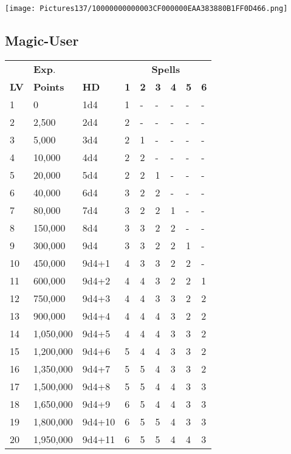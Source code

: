 \documentclass[a4paper,twoside,openany,10pt]{book}
\begin{document}
\begin{multicols}{2}
\addvspace{0.8cm}

\texttt{[image: Pictures137/10000000000003CF000000EAA383880B1FF0D466.png]}


\subsection{Magic-User}\label{magic-user}

\begin{tabular*}{0.93\linewidth}{@{\extracolsep{\fill}}lllllllll}
& \textbf{Exp}. & & \multicolumn{6}{c}{\textbf{Spells}} \\
\textbf{LV} & \textbf{Points} & \textbf{HD} & \textbf{1} & \textbf{2} & \textbf{3} & \textbf{4} & \textbf{5} & \textbf{6} \\\toprule
1 & 0 & 1d4 & 1 & - & - & - & - & - \\\hline
2 & 2,500 & 2d4 & 2 & - & - & - & - & - \\\hline
3 & 5,000 & 3d4 & 2 & 1 & - & - & - & - \\\hline
4 & 10,000 & 4d4 & 2 & 2 & - & - & - & - \\\hline
5 & 20,000 & 5d4 & 2 & 2 & 1 & - & - & - \\\hline
6 & 40,000 & 6d4 & 3 & 2 & 2 & - & - & - \\\hline
7 & 80,000 & 7d4 & 3 & 2 & 2 & 1 & - & - \\\hline
8 & 150,000 & 8d4 & 3 & 3 & 2 & 2 & - & - \\\hline
9 & 300,000 & 9d4 & 3 & 3 & 2 & 2 & 1 & - \\\hline
10 & 450,000 & 9d4+1 & 4 & 3 & 3 & 2 & 2 & - \\\hline
11 & 600,000 & 9d4+2 & 4 & 4 & 3 & 2 & 2 & 1 \\\hline
12 & 750,000 & 9d4+3 & 4 & 4 & 3 & 3 & 2 & 2 \\\hline
13 & 900,000 & 9d4+4 & 4 & 4 & 4 & 3 & 2 & 2 \\\hline
14 & 1,050,000 & 9d4+5 & 4 & 4 & 4 & 3 & 3 & 2 \\\hline
15 & 1,200,000 & 9d4+6 & 5 & 4 & 4 & 3 & 3 & 2 \\\hline
16 & 1,350,000 & 9d4+7 & 5 & 5 & 4 & 3 & 3 & 2 \\\hline
17 & 1,500,000 & 9d4+8 & 5 & 5 & 4 & 4 & 3 & 3 \\\hline
18 & 1,650,000 & 9d4+9 & 6 & 5 & 4 & 4 & 3 & 3 \\\hline
19 & 1,800,000 & 9d4+10 & 6 & 5 & 5 & 4 & 3 & 3 \\\hline
20 & 1,950,000 & 9d4+11 & 6 & 5 & 5 & 4 & 4 & 3 \\\bottomrule
\end{tabular*}\medskip


\end{multicols}
\end{document}
